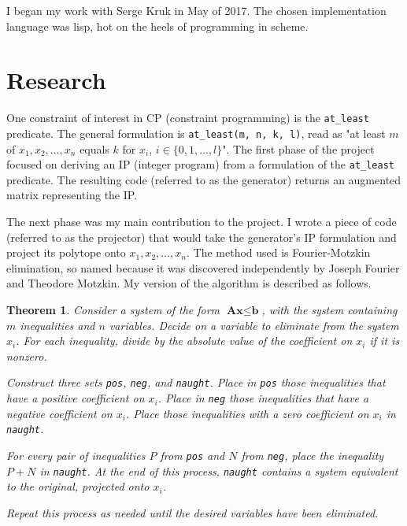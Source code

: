 \documentclass[12pt]{amsart}
\newtheorem{thm}{Theorem}
\begin{document}
I began my work with Serge Kruk in May of 2017. The chosen implementation language was lisp, hot on the heels of programming in scheme.


\section{Research}

One constraint of interest in CP (constraint programming) is the \texttt{at\_least} predicate. The general formulation is \texttt{at\_least(m, n, k, l)}, read as "at least $m$ of ${x_1, x_2, \ldots, x_n}$ equals $k$ for $x_i$, $i \in \{0, 1, \ldots, l\}$". The first phase of the project focused on deriving an IP (integer program) from a formulation of the \texttt{at\_least} predicate. The resulting code (referred to as the generator) returns an augmented matrix representing the IP.

The next phase was my main contribution to the project. I wrote a piece of code (referred to as the projector) that would take the generator's IP formulation and project its polytope onto $x_1, x_2, \ldots, x_n$. The method used is Fourier-Motzkin elimination, so named because it was discovered independently by Joseph Fourier and Theodore Motzkin. My version of the algorithm is described as follows.

\begin{thm}\label{thm-1}
	Consider a system of the form $\textbf{Ax} \leq \textbf{b}$, with the system containing $m$ inequalities and $n$ variables. Decide on a variable to eliminate from the system $x_i$. For each inequality, divide by the absolute value of the coefficient on $x_i$ if it is nonzero.
	
	Construct three sets \texttt{pos}, \texttt{neg}, and \texttt{naught}. Place in \texttt{pos} those inequalities that have a positive coefficient on $x_i$. Place in \texttt{neg} those inequalities that have a negative coefficient on $x_i$. Place those inequalities with a zero coefficient on $x_i$ in \texttt{naught}.
	
	For every pair of inequalities $P$ from \texttt{pos} and $N$ from \texttt{neg}, place the inequality $P + N$ in \texttt{naught}. At the end of this process, \texttt{naught} contains a system equivalent to the original, projected onto $x_i$.
	
	Repeat this process as needed until the desired variables have been eliminated.
	
\end{thm}
\end{document}
